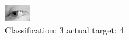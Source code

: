 \begin{figure}[h!]
\begin{center}
\includegraphics[width=0.60\columnwidth]{figures/ID3048_class_3_target_4.png}
\end{center}
\caption{ Classification: 3 actual target: 4}
\label{fig:ID3048_class_3_target_4}
\end{figure}
